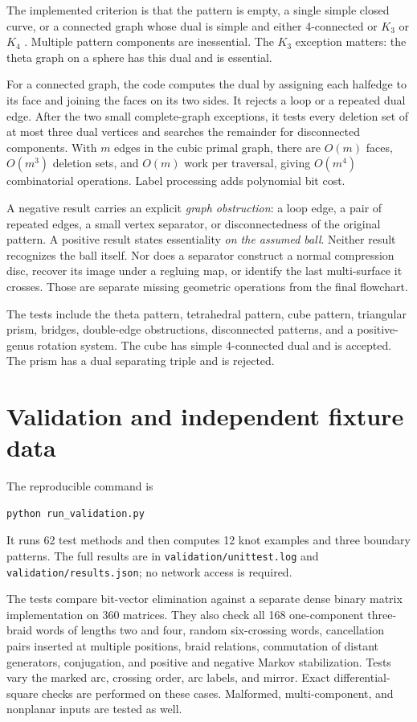 \documentclass[11pt]{article}
\theoremstyle{definition}
\newcommand{\code}[1]{\texttt{#1}}
\begin{document}
The implemented criterion is that the pattern is empty, a single simple
closed curve, or a connected graph whose dual is simple and either
4-connected or $K_3$ or $K_4$ \cite[Proposition 2.6]{hierarchies}. Multiple
pattern components are inessential. The $K_3$ exception matters: the theta
graph on a sphere has this dual and is essential.

For a connected graph, the code computes the dual by assigning each halfedge
to its face and joining the faces on its two sides. It rejects a loop or a
repeated dual edge. After the two small complete-graph exceptions, it tests
every deletion set of at most three dual vertices and searches the remainder
for disconnected components. With $m$ edges in the cubic primal graph, there
are $O(m)$ faces, $O(m^3)$ deletion sets, and $O(m)$ work per traversal, giving
$O(m^4)$ combinatorial operations. Label processing adds polynomial bit cost.

A negative result carries an explicit \emph{graph obstruction}: a loop edge,
a pair of repeated edges, a small vertex separator, or disconnectedness of
the original pattern. A positive result states essentiality \emph{on the
assumed ball}. Neither result recognizes the ball itself. Nor does a separator
construct a normal compression disc, recover its image under a regluing map,
or identify the last multi-surface it crosses. Those are separate missing
geometric operations from the final flowchart.

The tests include the theta pattern, tetrahedral pattern, cube pattern,
triangular prism, bridges, double-edge obstructions, disconnected patterns,
and a positive-genus rotation system. The cube has simple 4-connected dual
and is accepted. The prism has a dual separating triple and is rejected.

\section{Validation and independent fixture data}
The reproducible command is
\begin{verbatim}
python run_validation.py
\end{verbatim}
It runs 62 test methods and then computes 12 knot examples and three boundary
patterns. The full results are in \code{validation/unittest.log} and
\code{validation/results.json}; no network access is required.

The tests compare bit-vector elimination against a separate dense binary
matrix implementation on 360 matrices. They also check all 168 one-component
three-braid words of lengths two and four, random six-crossing words,
cancellation pairs inserted at multiple positions, braid relations,
commutation of distant generators, conjugation, and positive and negative
Markov stabilization. Tests vary the marked arc, crossing order, arc labels,
and mirror. Exact differential-square checks are performed on these cases.
Malformed, multi-component, and nonplanar inputs are tested as well.
\end{document}
